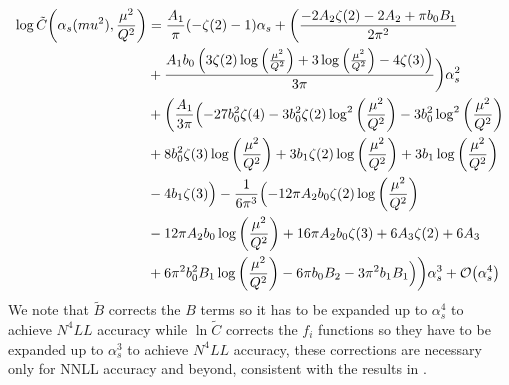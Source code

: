 \documentclass[../main.tex]{subfiles}
\begin{document}
\begin{align}
    \begin{split}
    \log \tilde{C}\qty(\alpha_s(mu^2), \frac{\mu^2}{Q^2}) &= \frac{A_1}{\pi } (-\zeta (2)-1) \alpha_s + \biggl(\frac{-2 A_2 \zeta (2)-2 A_2+\pi  b_0 B_1}{2 \pi ^2}\\
    &+\frac{A_1 b_0 \left(3 \zeta (2) \log \left(\frac{\mu ^2}{Q^2}\right)+3 \log \left(\frac{\mu ^2}{Q^2}\right) -4 \zeta (3)\right)}{3 \pi }\biggr)\alpha_s^2\\
    &+\biggl(\frac{A_1}{3 \pi } \Bigl(-27 b_0^2 \zeta (4)-3 b_0^2 \zeta (2) \log ^2\left(\frac{\mu ^2}{Q^2}\right)-3 b_0^2 \log ^2\left(\frac{\mu ^2}{Q^2}\right)\\
    &+8 b_0^2 \zeta (3) \log \left(\frac{\mu ^2}{Q^2}\right)+3 b_1 \zeta (2) \log \left(\frac{\mu ^2}{Q^2}\right)+3 b_1 \log \left(\frac{\mu ^2}{Q^2}\right)\\
    &-4 b_1 \zeta (3)\Bigr)-\frac{1}{6 \pi ^3}\Bigl(-12 \pi  A_2 b_0 \zeta (2) \log \left(\frac{\mu ^2}{Q^2}\right)\\
    &-12 \pi  A_2 b_0 \log \left(\frac{\mu ^2}{Q^2}\right)+16 \pi  A_2 b_0 \zeta (3)+6 A_3 \zeta (2)+6 A_3\\
    &+6 \pi ^2 b_0^2 B_1 \log \left(\frac{\mu ^2}{Q^2}\right)-6 \pi  b_0 B_2 -3 \pi ^2 b_1 B_1\Bigr)\biggr)\alpha_s^3 + \order{\alpha_s^4}
    \end{split}
\end{align}
We note that $\tilde{B}$ corrects the $B$ terms so it has to be expanded up to $\alpha_s^4$ to achieve $N^4LL$ accuracy while
$\ln \tilde{C}$ corrects the $f_i$ functions so they have to be expanded up to $\alpha_s^3$ to achieve $N^4LL$ accuracy, 
these corrections are necessary only for NNLL accuracy and beyond, consistent with the results in \cite{CATANI19933}.
\end{document}
